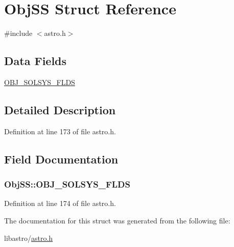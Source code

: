 \hypertarget{struct_obj_s_s}{\section{Obj\-S\-S Struct Reference}
\label{struct_obj_s_s}
}


{\ttfamily \#include $<$astro.\-h$>$}

\subsection*{Data Fields}
\begin{DoxyCompactItemize}
\item 
\hyperlink{struct_obj_s_s_a3e57d5f0c894378811f209e3eb96d8da}{O\-B\-J\-\_\-\-S\-O\-L\-S\-Y\-S\-\_\-\-F\-L\-D\-S}
\end{DoxyCompactItemize}


\subsection{Detailed Description}


Definition at line 173 of file astro.\-h.



\subsection{Field Documentation}
\hypertarget{struct_obj_s_s_a3e57d5f0c894378811f209e3eb96d8da}{
\subsubsection[{O\-B\-J\-\_\-\-S\-O\-L\-S\-Y\-S\-\_\-\-F\-L\-D\-S}]{\setlength{\rightskip}{0pt plus 5cm}Obj\-S\-S\-::\-O\-B\-J\-\_\-\-S\-O\-L\-S\-Y\-S\-\_\-\-F\-L\-D\-S}}\label{struct_obj_s_s_a3e57d5f0c894378811f209e3eb96d8da}


Definition at line 174 of file astro.\-h.



The documentation for this struct was generated from the following file\-:\begin{DoxyCompactItemize}
\item 
libastro/\hyperlink{astro_8h}{astro.\-h}\end{DoxyCompactItemize}
